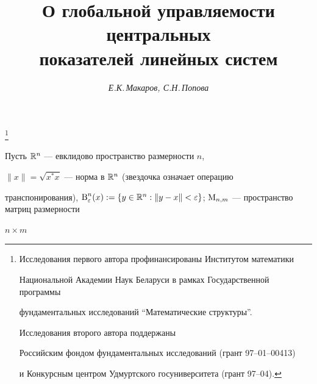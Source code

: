 








\author{\it Е.К.\,Макаров, С.Н.\,Попова}




\title{О глобальной управляемости центральных \\


показателей линейных систем}


\thanks{Исследования первого автора профинансированы Институтом математики


Национальной Академии Наук Беларуси в рамках Государственной программы


фундаментальных исследований ``Математические структуры''.


Исследования второго автора поддержаны


Российским фондом фундаментальных исследований (грант 97--01--00413)


и Конкурсным центром Удмуртского госуниверситета (грант 97--04).}





\date{}




\pagestyle{plain} %







\maketitle


\label{begin}





Пусть $\Bbb R^n$ --- евклидово пространство размерности $n$,


$\|x\|=\sqrt{x^*x}$ --- норма в $\Bbb R^n$ (звездочка означает операцию


транспонирования), $\Ball_{\varepsilon}^n(x):=\{y\in\Rp^n:


\|y-x\|<\varepsilon\}$; $\M_{n,m}$ --- пространство матриц размерности


$n\times m$


